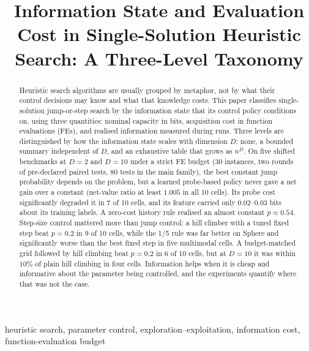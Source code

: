 \documentclass[conference]{IEEEtran}
\begin{document}
\title{Information State and Evaluation Cost in Single-Solution Heuristic Search: A Three-Level Taxonomy}

\author{
}

\maketitle

\begin{abstract}
Heuristic search algorithms are usually grouped by metaphor, not by what their control decisions may know and what that knowledge costs. This paper classifies single-solution jump-or-step search by the information state that its control policy conditions on, using three quantities: nominal capacity in bits, acquisition cost in function evaluations (FEs), and realised information measured during runs. Three levels are distinguished by how the information state scales with dimension $D$: none, a bounded summary independent of $D$, and an exhaustive table that grows as $n^D$. On five shifted benchmarks at $D=2$ and $D=10$ under a strict FE budget (30 instances, two rounds of pre-declared paired tests, 80 tests in the main family), the best constant jump probability depends on the problem, but a learned probe-based policy never gave a net gain over a constant (net-value ratio at least $1.005$ in all 10 cells). Its probe cost significantly degraded it in 7 of 10 cells, and its feature carried only $0.02$--$0.03$ bits about its training labels. A zero-cost history rule realised an almost constant $p\approx0.54$. Step-size control mattered more than jump control: a hill climber with a tuned fixed step beat $p=0.2$ in 9 of 10 cells, while the 1/5 rule was far better on Sphere and significantly worse than the best fixed step in five multimodal cells. A budget-matched grid followed by hill climbing beat $p=0.2$ in 6 of 10 cells, but at $D=10$ it was within $10\%$ of plain hill climbing in four cells. Information helps when it is cheap and informative about the parameter being controlled, and the experiments quantify where that was not the case.
\end{abstract}

\begin{IEEEkeywords}
heuristic search, parameter control, exploration--exploitation, information cost, function-evaluation budget
\end{IEEEkeywords}
\end{document}
